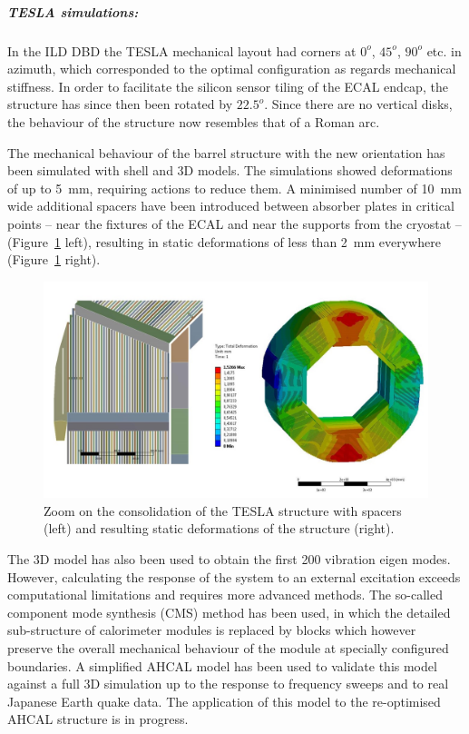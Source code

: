 \subparagraph{\textbf{TESLA simulations:}} 

In the ILD DBD the TESLA mechanical layout had corners at $0^{o}$, $45^{o}$, $90^{o}$ etc. in azimuth, which corresponded to the optimal configuration as regards mechanical stiffness. In order to facilitate the silicon sensor tiling of the ECAL endcap, the structure has since then been rotated by $22.5^{o}$. Since there are no vertical disks, the behaviour of the structure now resembles that of a Roman arc. 

The mechanical behaviour of the barrel structure with the new orientation has been simulated with shell and 3D models. The simulations showed deformations of up to 5~mm, requiring actions to reduce them. A minimised number of 10~mm wide additional spacers have been introduced between absorber plates in critical points -- near the fixtures of the ECAL and near the supports from the cryostat -- (Figure~\ref{fig:integration:Tesla_deformations} left), resulting in static deformations of less than 2~mm everywhere (Figure~\ref{fig:integration:Tesla_deformations} right). 

\begin{figure}[t!]
\centering
\includegraphics[width=1.0\hsize]{Integration/fig/Tesla_studies.jpg}
\caption{\label{fig:integration:Tesla_deformations}Zoom on the consolidation of the TESLA structure with spacers (left) and resulting static deformations of the structure (right).}
\end{figure}

The 3D model has also been used to obtain the first 200 vibration eigen modes. However, calculating the response of the system to an external excitation exceeds computational limitations and requires more advanced methods. 
The so-called component mode synthesis (CMS) method has been used, in which the detailed sub-structure of calorimeter modules is replaced by blocks which however preserve the overall mechanical behaviour of the module at specially configured boundaries. 
A simplified AHCAL model has been used to validate this model against a full 3D simulation up to the response to frequency sweeps and to real Japanese Earth quake data. 
The application of this model to the re-optimised AHCAL structure is in progress. 

